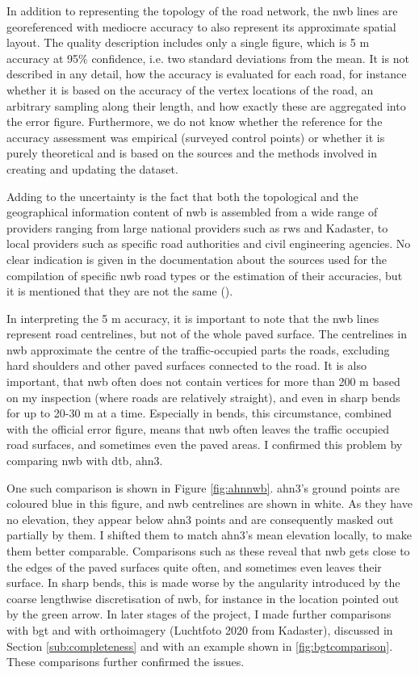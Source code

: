 In addition to representing the topology of the road network, the \ac{nwb} lines are georeferenced with mediocre accuracy to also represent its approximate spatial layout. The quality description includes only a single figure, which is 5 m accuracy at 95\% confidence, i.e. two standard deviations from the mean. It is not described in any detail, how the accuracy is evaluated for each road, for instance whether it is based on the accuracy of the vertex locations of the road, an arbitrary sampling along their length, and how exactly these are aggregated into the error figure. Furthermore, we do not know whether the reference for the accuracy assessment was empirical (surveyed control points) or whether it is purely theoretical and is based on the sources and the methods involved in creating and updating the dataset.

Adding to the uncertainty is the fact that both the topological and the geographical information content of \ac{nwb} is assembled from a wide range of providers ranging from large national providers such as \ac{rws} and Kadaster, to local providers such as specific road authorities and civil engineering agencies. No clear indication is given in the documentation about the sources used for the compilation of specific \ac{nwb} road types or the estimation of their accuracies, but it is mentioned that they are not the same (\cite{nwb_docs}).

In interpreting the 5 m accuracy, it is important to note that the \ac{nwb} lines represent road centrelines, but not of the whole paved surface. The centrelines in \ac{nwb} approximate the centre of the traffic-occupied parts the roads, excluding hard shoulders and other paved surfaces connected to the road. It is also important, that \ac{nwb} often does not contain vertices for more than 200 m based on my inspection (where roads are relatively straight), and even in sharp bends for up to 20-30 m at a time. Especially in bends, this circumstance, combined with the official error figure, means that \ac{nwb} often leaves the traffic occupied road surfaces, and sometimes even the paved areas. I confirmed this problem by comparing \ac{nwb} with \ac{dtb}, \ac{ahn3}.

One such comparison is shown in Figure \ref{fig:ahnnwb}. \ac{ahn3}'s ground points are coloured blue in this figure, and \ac{nwb} centrelines are shown in white. As they have no elevation, they appear below \ac{ahn3} points and are consequently masked out partially by them. I shifted them to match \ac{ahn3}'s mean elevation locally, to make them better comparable. Comparisons such as these reveal that \ac{nwb} gets close to the edges of the paved surfaces quite often, and sometimes even leaves their surface. In sharp bends, this is made worse by the angularity introduced by the coarse lengthwise discretisation of \ac{nwb}, for instance in the location pointed out by the green arrow. In later stages of the project, I made further comparisons with \ac{bgt} and with orthoimagery (Luchtfoto 2020 from Kadaster), discussed in Section \ref{sub:completeness} and with an example shown in \ref{fig:bgtcomparison}. These comparisons further confirmed the issues.

